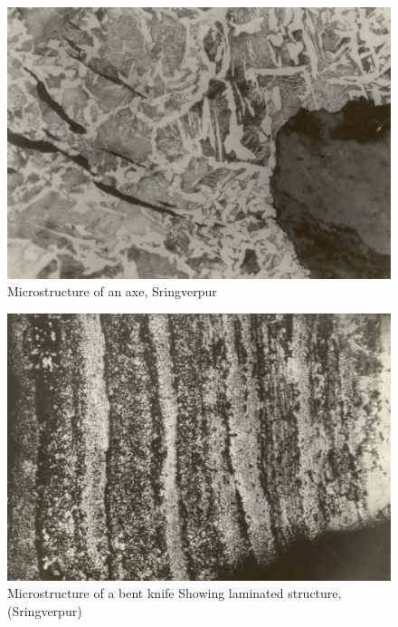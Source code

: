 
\begin{figure}[H]
\renewcommand{\thefigure}{27B}
\includegraphics[scale=0.85]{images/chapter-4/fig027B.jpg}
\caption{Microstructure of an axe, Sringverpur}\label{chapter-4-fig27B}
\end{figure}

\newpage

\begin{figure}[H]
\renewcommand{\thefigure}{27C}
\includegraphics[scale=0.75]{images/chapter-4/fig027C.jpg}
\caption{Microstructure of a bent knife Showing laminated structure, (Sringverpur)}\label{chapter-4-fig27C}
\end{figure}

\vspace{-.5cm}

